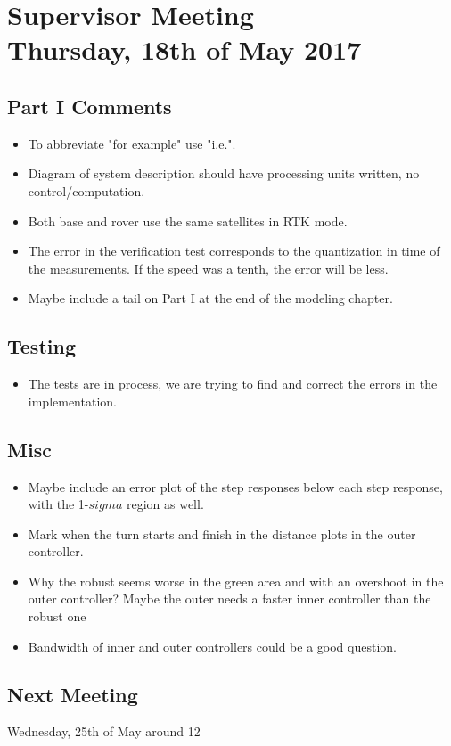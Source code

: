 
\renewcommand{\vec}[1]{\boldsymbol{\mathbf{#1}}}


\section*{Supervisor Meeting\\ \small Thursday, 18th of May 2017}

\subsection{Part I Comments}
\begin{itemize}
	\item To abbreviate "for example" use "i.e.".
    \item Diagram of system description should have processing units written, no control/computation.
    \item Both base and rover use the same satellites in RTK mode.
    \item The error in the verification test corresponds to the quantization in time of the measurements. If the speed was a tenth, the error will be less.
    \item Maybe include a tail on Part I at the end of the modeling chapter.
\end{itemize} 
\subsection{Testing}
\begin{itemize}
    \item The tests are in process, we are trying to find and correct the errors in the implementation.
\end{itemize}
\subsection{Misc}
\begin{itemize}
    \item Maybe include an error plot of the step responses below each step response, with the 1-$sigma$ region as well.
    \item Mark when the turn starts and finish in the distance plots in the outer controller.
    \item Why the robust seems worse in the green area and with an overshoot in the outer controller? Maybe the outer needs a faster inner controller than the robust one
    \item Bandwidth of inner and outer controllers could be a good question.
\end{itemize}

\subsection{Next Meeting}
Wednesday, 25th of May around 12
